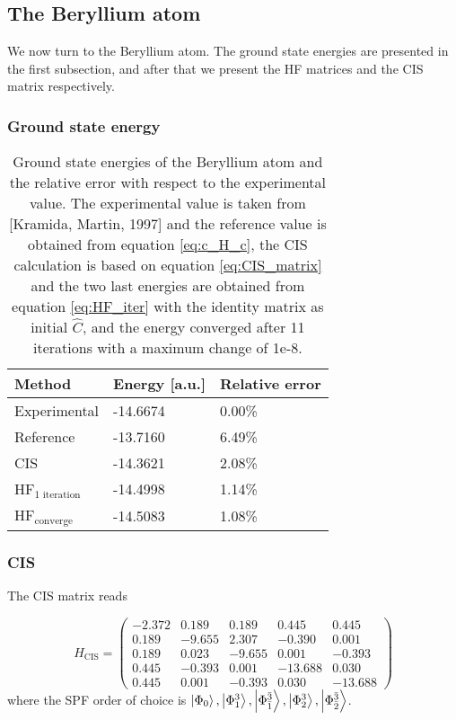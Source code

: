 \subsection{The Beryllium atom}
We now turn to the Beryllium atom. The ground state energies are presented in the first subsection, and after that we present the HF matrices and the CIS matrix respectively. 

\subsubsection{Ground state energy}
\begin{table} [H]
	\caption{Ground state energies of the Beryllium atom and the relative error with respect to the experimental value. The experimental value is taken from [Kramida, Martin, 1997] and the reference value is obtained from equation \eqref{eq:c_H_c}, the CIS calculation is based on equation \eqref{eq:CIS_matrix} and the two last energies are obtained from equation \eqref{eq:HF_iter} with the identity matrix as initial $\hat{C}$, and the energy converged after 11 iterations with a maximum change of 1e-8.}
	\begin{tabularx}{\textwidth}{X|X|X} \hline\hline
		\textbf{Method}&\textbf{Energy} [a.u.]&\textbf{Relative error}\\ \hline
		Experimental & -14.6674 & 0.00\%  \\
		Reference & -13.7160 & 6.49\% \\
		CIS & -14.3621 &  2.08\% \\
		HF$_{\text{1 iteration}}$ &  -14.4998 & 1.14\% \\
		HF$_{\text{converge}}$ & -14.5083 & 1.08\% \\ \hline\hline
	\end{tabularx}
	\label{tab:gs_be}
\end{table}

\subsubsection{CIS}
The CIS matrix reads

\begin{equation}
\hat{H}_{\text{CIS}}=
\begin{pmatrix}
-2.372 & 0.189 & 0.189 & 0.445 & 0.445\\
0.189 & -9.655 & 2.307 & -0.390 & 0.001\\
0.189 & 0.023 & -9.655 & 0.001 & -0.393\\
0.445 & -0.393 & 0.001 & -13.688 & 0.030\\
0.445 & 0.001 & -0.393 & 0.030 & -13.688
\end{pmatrix}
\label{eq:H_Be}
\end{equation}
where the SPF order of choice is $\ket{\Phi_0}, \ket{\Phi_1^3}, \ket{\Phi_{\bar{1}}^{\bar{3}}}, \ket{\Phi_2^3}, \ket{\Phi_{\bar{2}}^{\bar{3}}}$.

